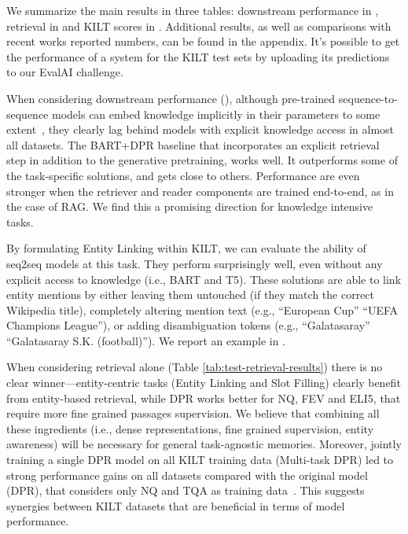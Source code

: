 \documentclass[11pt]{article}
\begin{document}
We summarize the main results in three tables: downstream performance in , retrieval in  and KILT scores in . Additional results, as well as comparisons with recent works reported numbers, can be found in the appendix. It's possible to get the performance of a system for the KILT test sets by uploading its predictions to our EvalAI challenge.\footnotemark[5]

When considering downstream performance (), although pre-trained sequence-to-sequence models can embed knowledge implicitly in their parameters to some extent~\cite{petroni2019language,roberts2020much}, they clearly lag behind models with explicit knowledge access in almost all datasets.
The BART+DPR baseline that incorporates an explicit retrieval step in addition to the generative pretraining, works well. It outperforms some of the task-specific solutions, and gets close to others. Performance are even stronger when the retriever and reader components are trained end-to-end, as in the case of RAG. We find this a promising direction for knowledge intensive tasks.

By formulating Entity Linking within KILT, we can evaluate the ability of seq2seq models at this task. They perform surprisingly well, even without any explicit access to knowledge (i.e., BART and T5). These solutions are able to link entity mentions by either leaving them untouched (if they match the correct Wikipedia title), completely altering mention text (e.g.,  ``European Cup'' 	 ``UEFA Champions League''), or adding disambiguation tokens (e.g., ``Galatasaray''	 ``Galatasaray S.K. (football)''). 
We report an example in . 

When considering retrieval alone (Table \ref{tab:test-retrieval-results}) there is no clear winner---entity-centric tasks (Entity Linking and Slot Filling) clearly benefit from entity-based retrieval, while DPR works better for NQ, FEV and ELI5, that require more fine grained passages supervision. We believe that combining all these ingredients (i.e., dense representations, fine grained supervision, entity awareness) will be necessary for general task-agnostic memories.
Moreover, jointly training a single DPR model on all KILT training data (Multi-task DPR) led to strong performance gains on all datasets compared with the original model (DPR), that considers only NQ and TQA as training data~\cite{karpukhin2020dense}. This suggests synergies between KILT datasets that are beneficial in terms of model performance.
\end{document}

